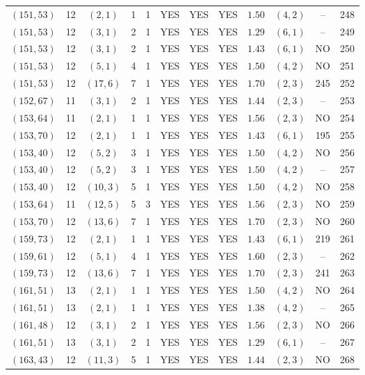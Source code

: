 \begin{longtable}{|c|c|c|c|c|c|c|c|c|c|c|c|}
$(151,53)$ & 12 & $(2,1)$ & 1 & 1 & YES & YES & YES & $1.50$ & $(4,2)$ & -- & 248\\
$(151,53)$ & 12 & $(3,1)$ & 2 & 1 & YES & YES & YES & $1.29$ & $(6,1)$ & -- & 249\\
$(151,53)$ & 12 & $(3,1)$ & 2 & 1 & YES & YES & YES & $1.43$ & $(6,1)$ & NO & 250\\
$(151,53)$ & 12 & $(5,1)$ & 4 & 1 & YES & YES & YES & $1.50$ & $(4,2)$ & NO & 251\\
$(151,53)$ & 12 & $(17,6)$ & 7 & 1 & YES & YES & YES & $1.70$ & $(2,3)$ & 245 & 252\\
$(152,67)$ & 11 & $(3,1)$ & 2 & 1 & YES & YES & YES & $1.44$ & $(2,3)$ & -- & 253\\
$(153,64)$ & 11 & $(2,1)$ & 1 & 1 & YES & YES & YES & $1.56$ & $(2,3)$ & NO & 254\\
$(153,70)$ & 12 & $(2,1)$ & 1 & 1 & YES & YES & YES & $1.43$ & $(6,1)$ & 195 & 255\\
$(153,40)$ & 12 & $(5,2)$ & 3 & 1 & YES & YES & YES & $1.50$ & $(4,2)$ & NO & 256\\
$(153,40)$ & 12 & $(5,2)$ & 3 & 1 & YES & YES & YES & $1.50$ & $(4,2)$ & -- & 257\\
$(153,40)$ & 12 & $(10,3)$ & 5 & 1 & YES & YES & YES & $1.50$ & $(4,2)$ & NO & 258\\
$(153,64)$ & 11 & $(12,5)$ & 5 & 3 & YES & YES & YES & $1.56$ & $(2,3)$ & NO & 259\\
$(153,70)$ & 12 & $(13,6)$ & 7 & 1 & YES & YES & YES & $1.70$ & $(2,3)$ & NO & 260\\
$(159,73)$ & 12 & $(2,1)$ & 1 & 1 & YES & YES & YES & $1.43$ & $(6,1)$ & 219 & 261\\
$(159,61)$ & 12 & $(5,1)$ & 4 & 1 & YES & YES & YES & $1.60$ & $(2,3)$ & -- & 262\\
$(159,73)$ & 12 & $(13,6)$ & 7 & 1 & YES & YES & YES & $1.70$ & $(2,3)$ & 241 & 263\\
$(161,51)$ & 13 & $(2,1)$ & 1 & 1 & YES & YES & YES & $1.50$ & $(4,2)$ & NO & 264\\
$(161,51)$ & 13 & $(2,1)$ & 1 & 1 & YES & YES & YES & $1.38$ & $(4,2)$ & -- & 265\\
$(161,48)$ & 12 & $(3,1)$ & 2 & 1 & YES & YES & YES & $1.56$ & $(2,3)$ & NO & 266\\
$(161,51)$ & 13 & $(3,1)$ & 2 & 1 & YES & YES & YES & $1.29$ & $(6,1)$ & -- & 267\\
$(163,43)$ & 12 & $(11,3)$ & 5 & 1 & YES & YES & YES & $1.44$ & $(2,3)$ & NO & 268\\

\end{longtable}
